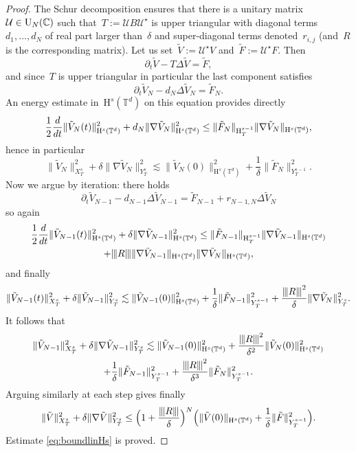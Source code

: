 \documentclass[JEP,XML,SOM,Unicode,published]{cedram}
\let\Re\relax
\DeclareMathOperator{\Re}{Re}
\theoremstyle{definition}
\newcommand\T{\mathbb{T}}
\renewcommand\H{\mathrm{H}}
\newcommand{\vertiii}[1]{{\vert\kern-0.08em\vert\kern-0.08em\vert #1 \vert\kern-0.08em\vert\kern-0.08em\vert}}
\begin{document}
\begin{proof}

The Schur decomposition ensures that there is a unitary matrix~$\mathcal U\in\textnormal{U}_N(\mathbb{C})$ such that~$T:= \mathcal U B \mathcal U^\star$ is upper triangular with diagonal terms~$d_1,\dots,d_N $ of real part larger than~$ \delta$ and super-diagonal terms denoted~$r_{i,j}$ (and~$R$ is the corresponding matrix).
Let us set~$\tilde V:= \mathcal U^\star V$ and~$\tilde F:= \mathcal U^\star F$. Then
\[
\partial_t \tilde V-T \Delta \tilde V = \tilde F,
\]
and since~$T$ is upper triangular in particular the last component satisfies
\[
\partial_t \tilde V_N -d_N \Delta \tilde V_N = \tilde F_N.
\]
An energy estimate in~$\H^s(\T^d)$ on this equation provides directly
\[
\frac12\frac d {dt}\| \tilde V_N(t)\|_{\H^s(\T^d)}^2+ \Re d_N \|\nabla \tilde V_N\|_{\H^s(\T^d)}^2 \leq \| \tilde F_N\|_{\H_{T}^{s-1}}\|\nabla \tilde V_N\|_{\H^s(\T^d)},
\]
hence
in particular
\[
\| \tilde V_N\|_{X_{T}^s}^2 + \delta \|\nabla \tilde V_N\|_{Y_{T}^s}^2 \lesssim \| \tilde V_N(0)\|^2_{\H^s(\T^d)} + \frac{1}{\delta} \| \tilde F_N\|_{Y_{T}^{s-1}}^2.
\]
Now we argue by iteration: there holds
\[
\partial_t \tilde V_{N-1} -d_{N-1} \Delta \tilde V_{N-1} = \tilde F_{N-1} + r_{N-1,N}\Delta \tilde V_{N }
\]
so
again
\begin{multline*}
\frac12\frac d {dt}\| \tilde V_{N-1}(t)\|_{\H^s(\T^d)}^2 +\delta \|\nabla \tilde V_{N-1}\|_{\H^s(\T^d)}^2 \leq \| \tilde F_{N-1}\|_{\H_{T}^{s-1}}\|\nabla \tilde V_{N-1}\|_{\H^s(\T^d)}\\
+\vertiii{R} \|\nabla \tilde V_{N-1}\|_{\H^s(\T^d)} \|\nabla \tilde V_{N}\|_{\H^s(\T^d)},
\end{multline*}
and finally
\[
\| \tilde V_{N-1}(t)\|_{X_{T}^s}^2 + \delta \| \tilde V_{N-1}\|_{Y_{T}^s}^2 \lesssim \| \tilde V_{N-1}(0)\|^2_{\H^s(\T^d)} + \frac{1}{\delta} \| \tilde F_{N-1}\|_{Y_{T}^{s-1}}^2
+ \frac {\vertiii{R}^2}{\delta} \|\nabla \tilde V_N\|_{Y_{T}^s}^2.
\]
It follows that
\begin{multline*}
\| \tilde V_{N-1}\|_{X_{T}^s}^2 + \delta \| \nabla \tilde V_{N-1}\|_{Y_{T}^s}^2 \lesssim \| \tilde V_{N-1}(0)\|^2_{\H^s(\T^d)} + \frac {\vertiii{R}^2}{\delta^2}\| \tilde V_{N}(0)\|^2_{\H^s(\T^d)} \\
+ \frac{1}{\delta} \| \tilde F_{N-1}\|_{Y_{T}^{s-1}}^2 + \frac {\vertiii{R}^2}{\delta^3}\| \tilde F_{N}\|_{Y_{T}^{s-1}}^2.
\end{multline*}
Arguing similarly at each step gives finally
\[
\| \tilde V \|_{X_{T}^s}^2 +\delta \| \nabla \tilde V \|_{Y_{T}^s}^2 \leq \Bigl(1+ \frac{\vertiii{R} }{\delta}\Bigr)^N\Bigl(\| \tilde V (0)\|_{\H^s(\T^d)} + \frac1\delta \| \tilde F \|_{Y_{T}^{s-1}}^2 \Bigr).
\]
Estimate \eqref{eq:boundlinHs} is proved.
\end{proof}
\end{document}
